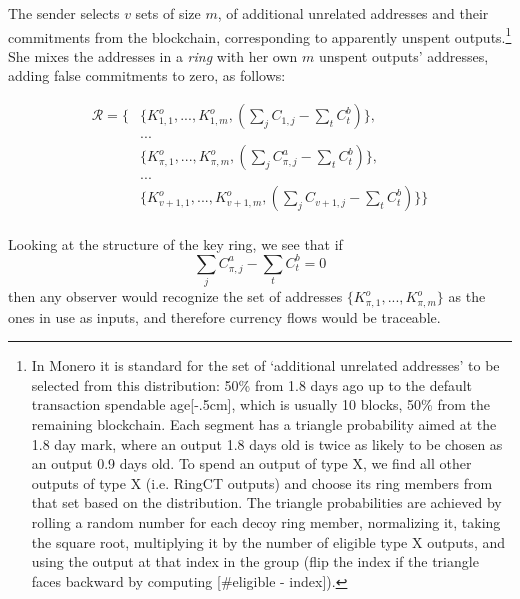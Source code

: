 The sender selects $v$ sets of size $m$, of additional unrelated addresses and their commitments from the blockchain, corresponding to apparently unspent outputs.\footnote{\label{input-selection}In Monero it is standard for the set of `additional unrelated addresses' to be selected from this distribution: 50\% from 1.8 days ago up to the default transaction spendable age[-.5cm], which is usually 10 blocks, 50\% from the remaining blockchain. Each segment has a triangle probability aimed at the 1.8 day mark, where an output 1.8 days old is twice as likely to be chosen as an output 0.9 days old. To spend an output of type X, we find all other outputs of type X (i.e. RingCT outputs) and choose its ring members from that set based on the distribution. The triangle probabilities are achieved by rolling a random number for each decoy ring member, normalizing it, taking the square root, multiplying it by the number of eligible type X outputs, and using the output at that index in the group (flip the index if the triangle faces backward by computing [\#eligible - index]).} She mixes the addresses in a {\em ring} with her own $m$ unspent outputs' addresses, adding false commitments to zero, as follows:

\begin{align*}
  \mathcal{R} = \{ &\{K_{1,1}^o,...,K_{1,m}^o, (\sum\limits_j C_{1, j} - \sum\limits_t C^b_{t})\}, \\
  &... \\
  &\{K_{\pi,1}^o,...,K_{\pi,m}^o, (\sum\limits_j C^a_{\pi, j} - \sum\limits_t C^b_{t})\}, \\
  &... \\
  &\{K_{v+1,1}^o,...,K_{v+1,m}^o, (\sum\limits_j C_{v+1, j} - \sum\limits_t C^b_{t})\}\}
\end{align*}
\\

Looking at the structure of the key ring, we see that if  \[\sum\limits_j C^a_{\pi, j} -\sum\limits_t C^b_{t} = 0\] then any observer would recognize the set of addresses
$\{K_{\pi,1}^o,...,K_{\pi,m}^o\}$
as the ones in use as inputs, and therefore currency flows would be traceable.

